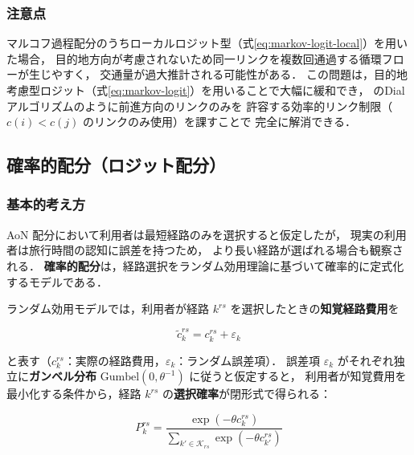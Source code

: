 \subsubsection*{注意点}

マルコフ過程配分のうちローカルロジット型（式\eqref{eq:markov-logit-local}）を用いた場合，
目的地方向が考慮されないため同一リンクを複数回通過する循環フローが生じやすく，
交通量が過大推計される可能性がある．
この問題は，目的地考慮型ロジット（式\eqref{eq:markov-logit}）を用いることで大幅に緩和でき，
のDial アルゴリズムのように前進方向のリンクのみを
許容する効率的リンク制限（$c(i) < c(j)$ のリンクのみ使用）を課すことで
完全に解消できる\cite{Akamatsu1996,Dial1971}．

\subsection{確率的配分（ロジット配分）}
\label{subsec:stochastic-assignment}

\subsubsection*{基本的考え方}

AoN 配分において利用者は最短経路のみを選択すると仮定したが，
現実の利用者は旅行時間の認知に誤差を持つため，
より長い経路が選ばれる場合も観察される．
\textbf{確率的配分}は，経路選択をランダム効用理論に基づいて確率的に定式化するモデルである\cite{McFadden1974,Daganzo1977}．

ランダム効用モデルでは，利用者が経路 $k^{rs}$ を選択したときの\textbf{知覚経路費用}を

\begin{equation}
  \tilde{c}_k^{rs} = c_k^{rs} + \varepsilon_k
  \label{eq:perceived-cost}
\end{equation}

と表す（$c_k^{rs}$：実際の経路費用，$\varepsilon_k$：ランダム誤差項）．
誤差項 $\varepsilon_k$ がそれぞれ独立に\textbf{ガンベル分布}
$\mathrm{Gumbel}(0, \theta^{-1})$ に従うと仮定すると，
利用者が知覚費用を最小化する条件から，経路 $k^{rs}$ の\textbf{選択確率}が閉形式で得られる\cite{McFadden1974}：

\begin{equation}
  P_k^{rs} = \frac{\exp(-\theta c_k^{rs})}{\displaystyle\sum_{k' \in \mathcal{K}_{rs}} \exp(-\theta c_{k'}^{rs})}
  \label{eq:logit-prob-fi}
\end{equation}

